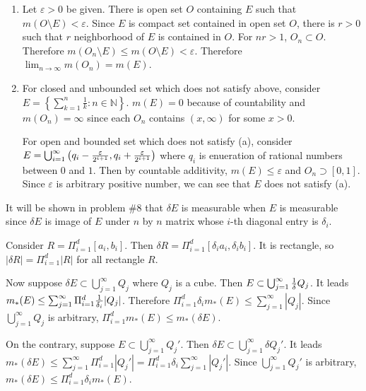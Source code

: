 \begin{problem}[1.5] \hfill
	\begin{enumerate}[label = (\alph*)]
		\item Let $\varepsilon>0$ be given. There is open set $O$ containing $E$ such that $m\left( O \setminus E \right) < \varepsilon$.
			Since $E$ is compact set contained in open set $O$, there is $r>0$ such that $r$ neighborhood of $E$ is contained in $O$. For $nr>1$, $O_n \subset O$. Therefore $m\left( O_n \setminus E \right) \leq m\left( O \setminus E \right) < \varepsilon$.
			Therefore $\lim_{n\rightarrow \infty}m(O_n) = m(E)$.

		\item For closed and unbounded set which does not satisfy above, consider $E = \left\{ \sum_{k=1}^n \frac{1}{k} : n \in \mathbb{N} \right\}$. 
			$m(E) = 0$ because of countability and $m(O_n) = \infty$ since each $O_n$ contains $(x, \infty)$ for some $x>0$.

			For open and bounded set which does not satisfy (a), consider $E = \bigcup_{i=1}^{\infty}\left( q_i - {\varepsilon \over 2^{i+1}}, q_i + {\varepsilon \over 2^{i+1}} \right)$ where $q_i$ is enueration of rational numbers between $0$ and $1$. Then by countable additivity, $m(E) \leq \varepsilon$ and $O_n \supset [0, 1]$. Since $\varepsilon$ is arbitrary positive number, we can see that $E$ does not satisfy (a).

		\end{enumerate}

\end{problem}

\begin{problem}[1.7] \hfill

	It will be shown in problem \#8 that $\delta E$ is measurable when $E$ is measurable since $\delta E$ is image of $E$ under $n$ by $n$ matrix whose $i$-th diagonal entry is $\delta_i$.	

	Consider $R = \Pi_{i=1}^d \left[ a_i, b_i \right]$. Then $\delta R = \Pi_{i=1}^{d}\left[ \delta_i a_i, \delta_i b_i \right]$. It is rectangle, so $|\delta R| = \Pi_{i=1}^d |R|$ for all rectangle $R$.

	Now suppose $\delta E \subset \bigcup_{j=1}^{\infty}Q_j$ where $Q_j$ is a cube. Then $E \subset \bigcup_{j=1}^\infty {1 \over \delta} Q_j$.
	It leads $m_{*}(E) \leq \sum_{j=1}^\infty \Pi_{i=1}^d {1 \over \delta_i} |Q_j|$. Therefore $\Pi_{i=1}^d \delta_i m_{*}(E) \leq \sum_{j=1}^\infty |Q_j|$. Since $\bigcup_{j=1}^\infty Q_j$ is arbitrary, $\Pi_{i=1}^d m_{*}\left( E \right) \leq m_{*}\left( \delta E \right)$.

	On the contrary, suppose $E \subset \bigcup_{j=1}^\infty Q_j'$. Then $\delta E \subset \bigcup_{j=1}^\infty \delta Q_j'$. It leads $m_{*}(\delta E) \leq \sum_{j=1}^\infty \Pi_{i=1}^d |Q_j'| = \Pi_{i=1}^d \delta_i \sum_{j=1}^\infty |Q_j'|$. Since $\bigcup_{j=1}^\infty Q_j'$ is arbitrary, $m_{*}(\delta E) \leq \Pi_{i=1}^d \delta_i  m_{*}\left( E \right)$.
	

\end{problem}

